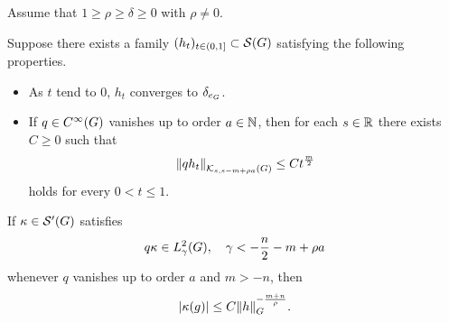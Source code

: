 \begin{theorem}
    Assume that $1 \geq \rho \geq \delta \geq 0$ with $\rho \neq 0$.

    Suppose there exists a family $(h_t)_{t \in (0, 1]} \subset \Schwartz \Group$
    satisfying the following properties.
    \begin{itemize}
        \item As $t$ tend to $0$, $h_t$ converges to $\delta_{e_\Group}$.
        \item If $q \in \SmoothFunctions {\Group}$ vanishes up to order $a \in \N$,
            then for each $s \in \R$ there exists $C \geq 0$ such that
            \begin{align}
                \norm [\KernelsSobolev s {s - m + \rho a}] {q h_t}
                \leq C t^{\frac m 2}
                \label{eq:kernel_estimates:heat_kernel_condition}
            \end{align}
            holds for every $0 < t \leq 1$.
    \end{itemize}

    If $\kappa \in \TemperedDistributions \Group$ satisfies
    \begin{align}
        q \kappa \in \Sobolev \gamma,
        \quad \gamma < -\frac n 2 -m + \rho a
        \label{eq:kernel_estimates:assumption_on_the_kernel}
    \end{align}
    whenever $q$ vanishes up to order $a$ and $m > -n$,
    then
    \begin{align*}
        \abs{\kappa(g)} \leq C \norm [\Group] h^{-\frac{m + n} \rho}.
    \end{align*}
\end{theorem}
